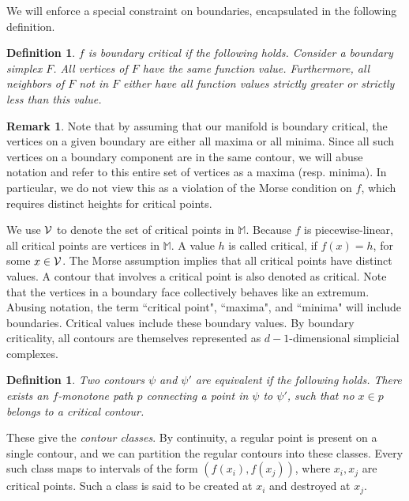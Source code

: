 \documentclass[11pt]{article}
\newtheorem{definition}[theorem]{Definition}
\theoremstyle{definition}
\newtheorem{remark}{Remark}
\newcommand{\cV}{{\cal V}}
\newcommand{\MM}{\mathbb{M}}
\begin{document}
We will enforce a special constraint on boundaries, encapsulated in the following definition.

\begin{definition} \label{def:bound} $f$ is \emph{boundary critical} if the following holds.
Consider a boundary simplex $F$. All vertices of $F$ have the same function value. Furthermore, all
neighbors of $F$ not in $F$ either have all function values strictly greater or strictly less
than this value.
\end{definition}

\begin{remark}
Note that by assuming that our manifold is boundary critical, the vertices on a given boundary are either all maxima or all minima.  
Since all such vertices on a boundary component are in the same contour, we will abuse notation and refer to this entire set of vertices as a maxima (resp. minima).
In particular, we do not view this as a violation of the Morse condition on $f$, which requires distinct heights for critical points.
\end{remark}

We use $\cV$ to denote the set of critical points in $\MM$.
Because $f$ is piecewise-linear, all critical points are vertices in $\MM$. 
A value $h$ is called critical, if $f(x) = h$, for some $x \in \cV$. The Morse assumption
implies that all critical points have distinct values. A contour that involves a critical
point is also denoted as critical. Note that the vertices in a boundary face collectively behaves like an extremum.
Abusing notation, the term ``critical point", ``maxima", and ``minima" will include boundaries.
Critical values include these boundary values. By boundary criticality, all contours are themselves
represented as $d-1$-dimensional simplicial complexes.

\begin{definition} \label{def:equiv} Two contours $\psi$ and $\psi'$ are equivalent 
if the following holds. There exists an $f$-monotone path $p$ connecting a point in $\psi$ to $\psi'$,
such that no $x \in p$ belongs to a critical contour.
\end{definition}

These give the \emph{contour classes}. By continuity, a regular point is present on a single contour,
and we can partition the regular contours into these classes. Every such class maps to intervals
of the form $(f(x_i),f(x_j))$, where $x_i, x_j$ are critical points. Such a class is said
to be created at $x_i$ and destroyed at $x_j$. 
\end{document}
